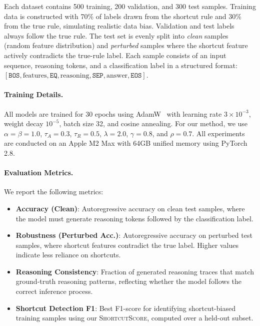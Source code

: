 Each dataset contains 500 training, 200 validation, and 300 test samples. Training data is constructed with 70\% of labels drawn from the shortcut rule and 30\% from the true rule, simulating realistic data bias. Validation and test labels always follow the true rule. The test set is evenly split into \emph{clean} samples (random feature distribution) and \emph{perturbed} samples where the shortcut feature actively contradicts the true-rule label. Each sample consists of an input sequence, reasoning tokens, and a classification label in a structured format: $[\texttt{BOS}, \text{features}, \texttt{EQ}, \text{reasoning}, \texttt{SEP}, \text{answer}, \texttt{EOS}]$.

\paragraph{Training Details.}
All models are trained for 30 epochs using AdamW~\citep{loshchilov2019decoupled} with learning rate $3 \times 10^{-3}$, weight decay $10^{-5}$, batch size 32, and cosine annealing. For our method, we use $\alpha = \beta = 1.0$, $\tau_A = 0.3$, $\tau_R = 0.5$, $\lambda = 2.0$, $\gamma = 0.8$, and $\rho = 0.7$. All experiments are conducted on an Apple M2 Max with 64GB unified memory using PyTorch 2.8.

\paragraph{Evaluation Metrics.}
We report the following metrics:
\begin{itemize}[leftmargin=*, itemsep=2pt]
    \item \textbf{Accuracy (Clean)}: Autoregressive accuracy on clean test samples, where the model must generate reasoning tokens followed by the classification label.
    \item \textbf{Robustness (Perturbed Acc.)}: Autoregressive accuracy on perturbed test samples, where shortcut features contradict the true label. Higher values indicate less reliance on shortcuts.
    \item \textbf{Reasoning Consistency}: Fraction of generated reasoning traces that match ground-truth reasoning patterns, reflecting whether the model follows the correct inference process.
    \item \textbf{Shortcut Detection F1}: Best F1-score for identifying shortcut-biased training samples using our \textsc{ShortcutScore}, computed over a held-out subset.
\end{itemize}

